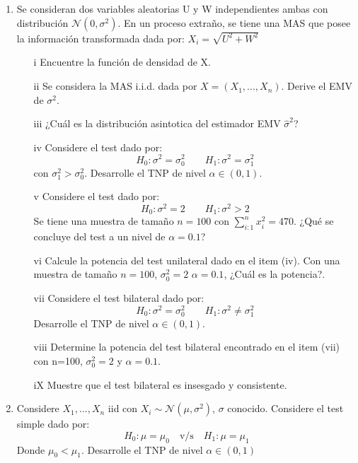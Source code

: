  \begin{enumerate}
     \item Se consideran dos variables aleatorias U y W independientes ambas con distribución $\mathcal{N}(0,\sigma^2)$. En un proceso extraño, se tiene una MAS que posee la información transformada dada por: $X_i=\sqrt{U^2+W^2}$

\begin{enumerate}
    \item[i] Encuentre la función de densidad de X.
    
    \item[ii] Se considera la MAS i.i.d. dada por $X=(X_1,...,X_n)$. Derive el EMV de $\sigma^2$.
    
    \item[iii]¿Cuál es la distribución asintotica del estimador EMV $\hat{\sigma}^2$?
    
    \item[iv] Considere el test dado por:
    \[ H_0: \sigma^2=\sigma^2_0 \qquad H_1:\sigma^2=\sigma^2_1 \]
    con $\sigma^2_1>\sigma^2_0$. Desarrolle el TNP de nivel $\alpha\in(0,1)$.
    
    \item[v] Considere el test dado por:
    \[ H_0: \sigma^2=2 \qquad H_1:\sigma^2>2 \]
    Se tiene una muestra de tamaño $n=100$ con $\sum\limits_{i:1}^n x_i^2=470$. ¿Qué se concluye del test a un nivel de $\alpha=0.1$?
    
    \item[vi] Calcule la potencia del test unilateral dado en el item (iv). Con una muestra de tamaño $n=100$, $\sigma^2_0=2$ $\alpha=0.1$, ¿Cuál es la potencia?.
    
    \item[vii] Considere el test bilateral dado por:
    \[ H_0: \sigma^2=\sigma^2_0 \qquad H_1:\sigma^2\neq\sigma^2_1 \]
    Desarrolle el TNP de nivel $\alpha\in(0,1)$.
    
    \item[viii] Determine la potencia del test bilateral encontrado en el item (vii) con n=100, $\sigma^2_0=2$ y $\alpha=0.1$.
    
    \item[iX] Muestre que el test bilateral es insesgado y consistente.
\end{enumerate}

\item Considere $X_1,...,X_n$ iid con $X_i\sim \mathcal{N}(\mu,\sigma^2)$, $\sigma$ conocido. 
Considere el test simple dado por:
\[ H_0: \mu =\mu_0 \quad \text{v/s} \quad H_1:\mu=\mu_1  \]
Donde $\mu_0<\mu_1$. Desarrolle el TNP de nivel $\alpha\in (0,1)$



\end{enumerate}
